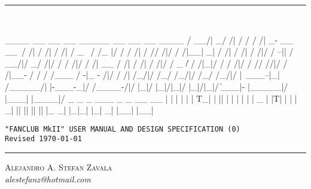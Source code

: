 \documentclass{article}
\newcommand{\version}{0} %
\begin{document}
\begin{titlepage}

\vspace*{\fill}
\flushleft
\rule{\textwidth}{5pt}\\[1em]
\centering
\begin{minipage}{0.8\textwidth}
\begin{verbnobox}[\ttfamily\fontdimen2\font=5.24995pt\fontdimen3\font=0.0pt\fontdimen4\font=0.0pt\fontdimen7\font=5.24995pt\hyphenchar\font=-1]
	      ____      __      __  __      _____      __      __    __    ____     
     / __/|   _/ /|    / / / /|  _- __ __\    / /|    / /|  / /|  / _  \    
    / /_ |/  / /  /|  /  // /|/ / /|__| _|   / /|    / /|  / /|/ /   --||   
   / __/|/ _/    /|/ /   / /|/ / /|    __   / /|    / /|  / /|/ / _  \|/    
  / /|_|/ /  /  /|/ / // //|/ / /|__- / /  / /___  / -|_ - /|/ /     /|     
 /_/|/   /_/ /_/|/ /_/ /_/|/ |\ ___--|_|  /_____/| |-___-_|/  /____-/|/     
 |_|/    |_|/|_|/  |_|/|_|/   \|___|-    |_____|/   |___|     |____|/       
                     _ _    _    ___   _  _      __   __                      
                    | | |  | |  | T_| | || |    |  | |  |                     
                    | _ |  |T|  |  |  |  _|      ||   ||                      
                    || || |_ _| |_|_| |_| _|    |__| |__|                     
	
\end{verbnobox}
\end{minipage}

{\centering


}
\vspace{2em}
\texttt{\large "FANCLUB MkII" USER MANUAL AND DESIGN SPECIFICATION (\version)}\\
\texttt{\small Revised \today}

\rule{\linewidth}{5pt}

\vspace{5em}

\centering
\textsc{\Large Alejandro A. Stefan Zavala}\\
\textit{alestefanz@hotmail.com}
\vspace{5em}




\end{titlepage}
\end{document}
